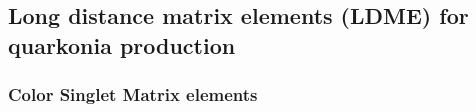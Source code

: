 \documentclass[aps,prc,preprint,superscriptaddress,showpacs,showkeys,amsmath]{revtex4-1}
\begin{document}









\subsection{Long distance matrix elements (LDME) for quarkonia production}
\label{section:Matrix}

\subsubsection{Color Singlet Matrix elements}
\end{document}
